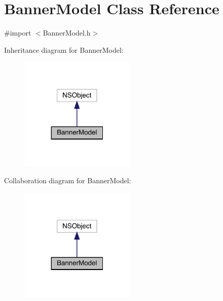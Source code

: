 \hypertarget{interface_banner_model}{}\section{Banner\+Model Class Reference}
\label{interface_banner_model}


{\ttfamily \#import $<$Banner\+Model.\+h$>$}



Inheritance diagram for Banner\+Model\+:\nopagebreak
\begin{figure}[H]
\begin{center}
\leavevmode
\includegraphics[width=155pt]{interface_banner_model__inherit__graph}
\end{center}
\end{figure}


Collaboration diagram for Banner\+Model\+:\nopagebreak
\begin{figure}[H]
\begin{center}
\leavevmode
\includegraphics[width=155pt]{interface_banner_model__coll__graph}
\end{center}
\end{figure}
